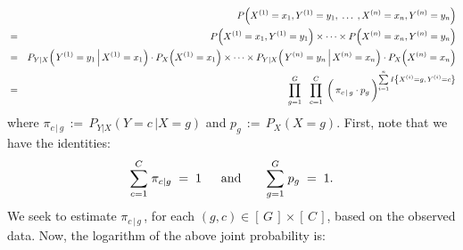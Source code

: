 \begin{eqnarray*}
&&
	P\!\left(X^{(1)} = x_{1},Y^{(1)}=y_{1}, \;\ldots\; ,X^{(n)} = x_{n},Y^{(n)}=y_{n}\right)
\\
&=&
	P\!\left(X^{(1)} = x_{1},Y^{(1)}=y_{1}\right) \times \cdots \times P\!\left(X^{(n)} = x_{n},Y^{(n)}=y_{n}\right)
\\
&=&
	P_{Y \vert X}\!\left(\left.Y^{(1)} = y_{1} \,\right\vert X^{(1)} = x_{1}\right) \cdot P_{X}\!\left(X^{(1)} = x_{1}\right)
	\times \cdots \times
	P_{Y \vert X}\!\left(\left.Y^{(n)} = y_{n} \,\right\vert X^{(n)} = x_{n}\right) \cdot P_{X}\!\left(X^{(n)} = x_{n}\right)
\\
&=&
	\overset{G}{\underset{g=1}{\prod}} \;\;\; \overset{C}{\underset{c=1}{\prod}} \;
	\left(\,\pi_{c\,\vert\,g} \overset{{\color{white}\vert}}{\cdot} p_{g}\,\right)
	^{\overset{n}{\underset{i=1}{\sum}}\,I\left\{X^{(i)}=g,\,Y^{(i)}=c\right\}}
\end{eqnarray*}
where
$\pi_{c\,\vert\,g} \,:=\, P_{Y \vert X}\!\left(\left.Y = c \,\right\vert X = g\right)$
and
$p_{g} \,:=\, P_{X}\!\left(X = g\right)$.
First, note that we have the identities:
\begin{equation*}
\overset{C}{\underset{c=1}{\sum}}\;\pi_{c\vert g} \; = \; 1
\;\;\quad\textnormal{and}\quad\quad
\overset{G}{\underset{g=1}{\sum}}\;p_{g} \; = \; 1.
\end{equation*}
We seek to estimate $\pi_{c\,\vert\,g}$\,,
for each $(g,c) \in \left[\,G\,\right] \times \left[\,C\,\right]$,
based on the observed data.
Now, the logarithm of the above joint probability is:
